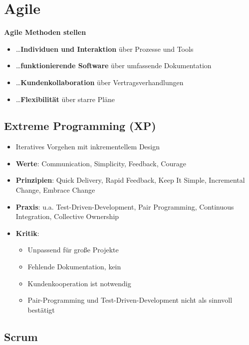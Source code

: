 \section{Agile}
\label{ag:sec:agile}

\textbf{Agile Methoden stellen}
\begin{itemize}
	\item \dots \textbf{Individuen und Interaktion} über Prozesse und Tools
	\item \dots \textbf{funktionierende Software} über umfassende Dokumentation
	\item \dots \textbf{Kundenkollaboration} über Vertragsverhandlungen
	\item \dots \textbf{Flexibilität} über starre Pläne
\end{itemize}

\subsection{Extreme Programming (XP)}
\label{ag:sub:extreme_programming}

\begin{itemize}
	\item Iteratives Vorgehen mit inkrementellem Design
	\item \textbf{Werte}: Communication, Simplicity, Feedback, Courage
	\item \textbf{Prinzipien}: Quick Delivery, Rapid Feedback, Keep It Simple, Incremental Change, Embrace Change
	\item \textbf{Praxis}: u.a. Test-Driven-Development, Pair Programming, Continuous Integration, Collective Ownership
	\item \textbf{Kritik}:
	\begin{itemize}
		\item Unpassend für große Projekte
		\item Fehlende Dokumentation, kein 
		\item Kundenkooperation ist notwendig
		\item Pair-Programming und Test-Driven-Development nicht als sinnvoll bestätigt
	\end{itemize}
\end{itemize}

\subsection{Scrum}
\label{ag:sub:scrum}

